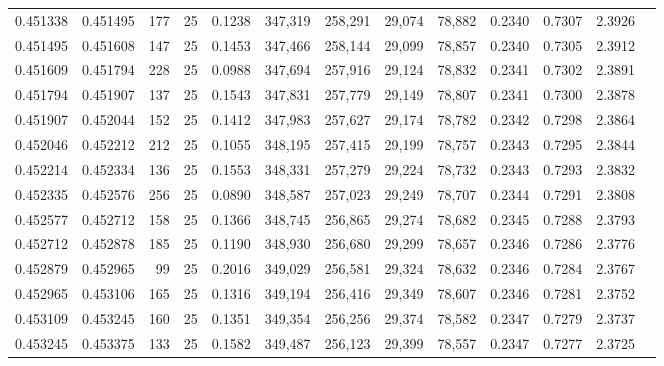 \begin{tabular}{rrrrrrrrrrrrr}
0.451338 & 0.451495 &   177 &  25 &                                     0.1238 & 347,319 & 258,291 &  29,074 &  78,882 & 0.2340 & 0.7307 & 2.3926 \\
0.451495 & 0.451608 &   147 &  25 &                                     0.1453 & 347,466 & 258,144 &  29,099 &  78,857 & 0.2340 & 0.7305 & 2.3912 \\
0.451609 & 0.451794 &   228 &  25 &                                     0.0988 & 347,694 & 257,916 &  29,124 &  78,832 & 0.2341 & 0.7302 & 2.3891 \\
0.451794 & 0.451907 &   137 &  25 &                                     0.1543 & 347,831 & 257,779 &  29,149 &  78,807 & 0.2341 & 0.7300 & 2.3878 \\
0.451907 & 0.452044 &   152 &  25 &                                     0.1412 & 347,983 & 257,627 &  29,174 &  78,782 & 0.2342 & 0.7298 & 2.3864 \\
0.452046 & 0.452212 &   212 &  25 &                                     0.1055 & 348,195 & 257,415 &  29,199 &  78,757 & 0.2343 & 0.7295 & 2.3844 \\
0.452214 & 0.452334 &   136 &  25 &                                     0.1553 & 348,331 & 257,279 &  29,224 &  78,732 & 0.2343 & 0.7293 & 2.3832 \\
0.452335 & 0.452576 &   256 &  25 &                                     0.0890 & 348,587 & 257,023 &  29,249 &  78,707 & 0.2344 & 0.7291 & 2.3808 \\
0.452577 & 0.452712 &   158 &  25 &                                     0.1366 & 348,745 & 256,865 &  29,274 &  78,682 & 0.2345 & 0.7288 & 2.3793 \\
0.452712 & 0.452878 &   185 &  25 &                                     0.1190 & 348,930 & 256,680 &  29,299 &  78,657 & 0.2346 & 0.7286 & 2.3776 \\
0.452879 & 0.452965 &    99 &  25 &                                     0.2016 & 349,029 & 256,581 &  29,324 &  78,632 & 0.2346 & 0.7284 & 2.3767 \\
0.452965 & 0.453106 &   165 &  25 &                                     0.1316 & 349,194 & 256,416 &  29,349 &  78,607 & 0.2346 & 0.7281 & 2.3752 \\
0.453109 & 0.453245 &   160 &  25 &                                     0.1351 & 349,354 & 256,256 &  29,374 &  78,582 & 0.2347 & 0.7279 & 2.3737 \\
0.453245 & 0.453375 &   133 &  25 &                                     0.1582 & 349,487 & 256,123 &  29,399 &  78,557 & 0.2347 & 0.7277 & 2.3725 \\

\end{tabular}
